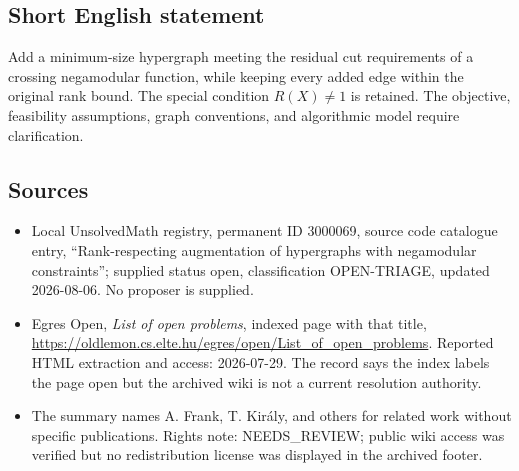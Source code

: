 \documentclass[11pt]{article}
\begin{document}
\subsection{Short English statement}
Add a minimum-size hypergraph meeting the residual cut requirements of a crossing negamodular function, while keeping every added edge within the original rank bound. The special condition $R(X)\ne1$ is retained. The objective, feasibility assumptions, graph conventions, and algorithmic model require clarification.
\subsection{Sources}
\begin{itemize}
\item Local UnsolvedMath registry, permanent ID 3000069, source code catalogue entry, ``Rank-respecting augmentation of hypergraphs with negamodular constraints''; supplied status open, classification OPEN-TRIAGE, updated 2026-08-06. No proposer is supplied.
\item Egres Open, \emph{List of open problems}, indexed page with that title, \url{https://oldlemon.cs.elte.hu/egres/open/List_of_open_problems}. Reported HTML extraction and access: 2026-07-29. The record says the index labels the page open but the archived wiki is not a current resolution authority.
\item The summary names A. Frank, T. Kir\'aly, and others for related work without specific publications. Rights note: NEEDS\_REVIEW; public wiki access was verified but no redistribution license was displayed in the archived footer.
\end{itemize}
\end{document}
